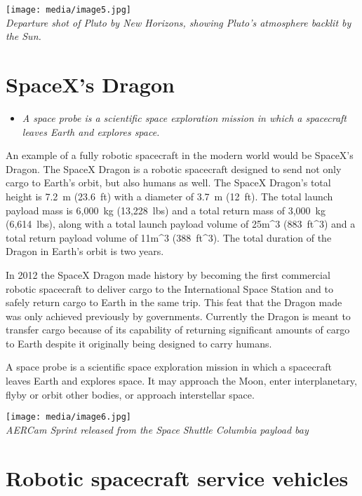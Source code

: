 \texttt{[image: media/image5.jpg]}\\
\emph{Departure shot of Pluto by New Horizons, showing Pluto's
atmosphere backlit by the Sun.}

\section{SpaceX's Dragon}\label{spacexs-dragon}

\begin{itemize}
\item
  \emph{A space probe is a scientific space exploration mission in which
  a spacecraft leaves Earth and explores space.}
\end{itemize}

An example of a fully robotic spacecraft in the modern world would be
SpaceX's Dragon. The SpaceX Dragon is a robotic spacecraft designed to
send not only cargo to Earth's orbit, but also humans as well. The
SpaceX Dragon's total height is 7.2~m (23.6~ft) with a diameter of 3.7~m
(12~ft). The total launch payload mass is 6,000~kg (13,228~lbs) and a
total return mass of 3,000~kg (6,614~lbs), along with a total launch
payload volume of 25m\^{}3 (883~ft\^{}3) and a total return payload
volume of 11m\^{}3 (388~ft\^{}3). The total duration of the Dragon in
Earth's orbit is two years.

In 2012 the SpaceX Dragon made history by becoming the first commercial
robotic spacecraft to deliver cargo to the International Space Station
and to safely return cargo to Earth in the same trip. This feat that the
Dragon made was only achieved previously by governments. Currently the
Dragon is meant to transfer cargo because of its capability of returning
significant amounts of cargo to Earth despite it originally being
designed to carry humans.

A space probe is a scientific space exploration mission in which a
spacecraft leaves Earth and explores space. It may approach the Moon,
enter interplanetary, flyby or orbit other bodies, or approach
interstellar space.

\texttt{[image: media/image6.jpg]}\\
\emph{AERCam Sprint released from the Space Shuttle Columbia payload
bay}

\section{Robotic spacecraft service
vehicles}\label{robotic-spacecraft-service-vehicles}

